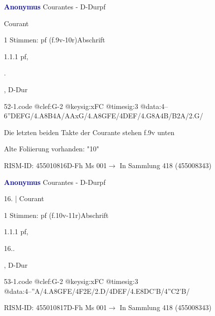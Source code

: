 \documentclass[twocolumn, 12pt]{book}
\begin{document}
\par \vspace{16pt} \textcolor{darkblue}{\textbf{Anonymus  }}\hfillplus{\textbf{[52]}}\newline Courantes - D-Dur\newline pf
\par \begin{itshape}[f.10r, at left:] Courant\end{itshape} 
\par \textcolor{darkblue}{}  1 Stimmen: pf  (f.9v-10r)\newline Abschrift
\par 1.1.1  pf, \begin{itshape}[15.].\end{itshape}, D-Dur  
\begin{filecontents*}{52-1.code}
@clef:G-2
@keysig:xFC
@timesig:3
@data:4--{6''DEFG}/4.A8B4A/AAxG/4.A{8GFE}/4DEF/4.G8A4B/B2A/2.G/
\end{filecontents*}
\newline %
\par Die letzten beiden Takte der Courante stehen f.9v unten
\par Alte Foliierung vorhanden: "10"
\par RISM-ID: 455010816\newline D-Fh  Ms 001\newline $\rightarrow$ In Sammlung 418 (455008343)
      
\par \vspace{16pt} \textcolor{darkblue}{\textbf{Anonymus  }}\hfillplus{\textbf{[53]}}\newline Courantes - D-Dur\newline pf
\par \begin{itshape}[f.10v, at left:] 16. | Courant\end{itshape} 
\par \textcolor{darkblue}{}  1 Stimmen: pf  (f.10v-11r)\newline Abschrift
\par 1.1.1  pf, \begin{itshape}16..\end{itshape}, D-Dur  
\begin{filecontents*}{53-1.code}
@clef:G-2
@keysig:xFC
@timesig:3
@data:4--''A/4.A{8GFE}/4F2E/2.D/4DEF/4.E{8DC'B}/4''C2'B/
\end{filecontents*}
\newline %
\par RISM-ID: 455010817\newline D-Fh  Ms 001\newline $\rightarrow$ In Sammlung 418 (455008343)
      
\end{document}
